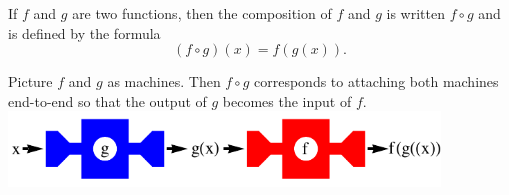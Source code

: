 \begin{frame}
\begin{definition}
If $f$ and $g$ are two functions, then the composition of $f$ and $g$ is written $f\circ g$ and is defined by the formula
\[
(f\circ g)(x) = f(g(x)).
\]
\end{definition}

Picture $f$ and $g$ as machines. Then $f\circ g$ corresponds to attaching both machines end-to-end so that the output of $g$ becomes the input of $f$.
\includegraphics[height=2cm]{precalculus/pictures/01-03-machines.pdf}%

\end{frame}
